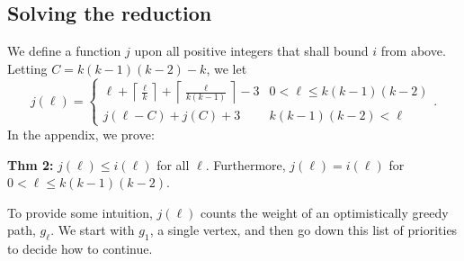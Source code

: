 \documentclass{article}
\DeclareMathOperator{\minto}{\bm{\mathsf{minto}}}
\newcommand{\hide}[1]{}
\newcommand{\edit}[1]{}%
\newcommand{\review}[1]{}%
\newcommand{\dc}[1]{}%
\begin{document}
\hide{
Bounding $R$ is a little more work. We note that for $p \in \mathcal{X}'$, and $u \not \in p$, that there is an exitless path $p_u$ containing $u$ and $p$, such that $w(p_u) = w(p) + (k-1)+w(u\to p[1])$, which implies that $w(p)+\minto(p) = \min_{u \in V(S_k) \setminus V(p)}\{w(p_u)-(k-1)\}$. Specifically: 

\[p_u = \sigma^{-(k-1)}(u)\dots \sigma^{-1}(u), u, p[1],p[2]\dots p[|p|]\]
It is clear that $|p_u| = |p|+k$, and that $\{p_u:\}$ thus we exactly have that $R = \min_{\ell > k}\{(i(\ell)-(k-1)+1)/(\ell-k) \}$.\dc{ explain how you get this last equation.} \review{I added ``exactly'' to clarify that this is sharp, but I think it sounds kinda awkward}

We note since the paths of $X$ are strongly exitless, that we should include the restriction that $\ell$ is divisible by $k$ in our reductions. However, it will never be the case that an $\ell$ not divisible by $k$ will give a smaller value than $\ell+1$, thus the clarification is not really necessary. (the reason why is that taking a 1-edge always lowers your average weight, and thus should always be done, and we can always do so when $\ell$ is not divisible by $k$) \textbf{\edit{too dense; could be explained better}}}

\subsection{Solving the reduction} \label{solving reduction}

We define a function $j$ upon all positive integers that shall bound $i$ from above. Letting $C = k(k-1)(k-2)-k$, we let
\[j(\ell) = \begin{cases} 
\ell + \left\lceil \frac{\ell}{k}\right\rceil + \left\lceil \frac{\ell}{k(k-1)}\right\rceil -3 & 0 < \ell \leq k(k-1)(k-2)\\
j(\ell-C) + j(C)+3 & k(k-1)(k-2) < \ell
\end{cases} .\]In the appendix,\edit{ref} we prove:

\textbf{Thm 2:}\edit{amsthm} $j(\ell) \leq i(\ell)$ for all $\ell$. Furthermore, $j(\ell) = i(\ell)$ for $0 < \ell \leq k(k-1)(k-2)$.

To provide some intuition, $j(\ell)$ counts the weight of an optimistically greedy path, $g_\ell$. We start with $g_1$, a single vertex, and then go down this list of priorities to decide how to continue.
\end{document}
